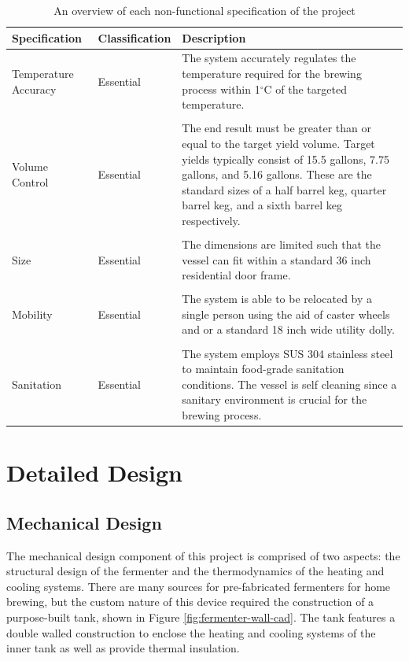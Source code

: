 \documentclass{article}
\begin{document}
\begin{table}[H]
\caption{An overview of each non-functional specification of the project}
\centering
\begin{tabularx}{\textwidth}{l l Z}
\toprule
\textbf{Specification} & \textbf{Classification} & \textbf{Description} \\ 
\midrule
Temperature Accuracy
& Essential
& The system accurately regulates the temperature required for the brewing process within 1$^{\circ}$C of the targeted temperature.
\\\\
Volume Control
& Essential
& The end result must be greater than or equal to the target yield volume.  Target yields typically consist of 15.5 gallons, 7.75 gallons, and 5.16 gallons.  These are the standard sizes of a half barrel keg, quarter barrel keg, and a sixth barrel keg respectively.
\\\\
Size
& Essential
& The dimensions are limited such that the vessel can fit within a standard 36 inch residential door frame.
\\\\
Mobility
& Essential
& The system is able to be relocated by a single person using the aid of caster wheels and or a standard 18 inch wide utility dolly.
\\\\
Sanitation
& Essential
& The system employs SUS 304 stainless steel to maintain food-grade sanitation conditions.  The vessel is self cleaning since a sanitary environment is crucial for the brewing process.
\\
\bottomrule
\end{tabularx}
\label{tab:non-func}
\end{table}
\pagebreak

\section{Detailed Design}
\subsection{Mechanical Design}
The mechanical design component of this project is comprised of two aspects: the structural design of the fermenter and the thermodynamics of the heating and cooling systems.  There are many sources for pre-fabricated fermenters for home brewing, but the custom nature of this device required the construction of a purpose-built tank, shown in Figure \ref{fig:fermenter-wall-cad}.  The tank features a double walled construction to enclose the heating and cooling systems of the inner tank as well as provide thermal insulation.
\end{document}
